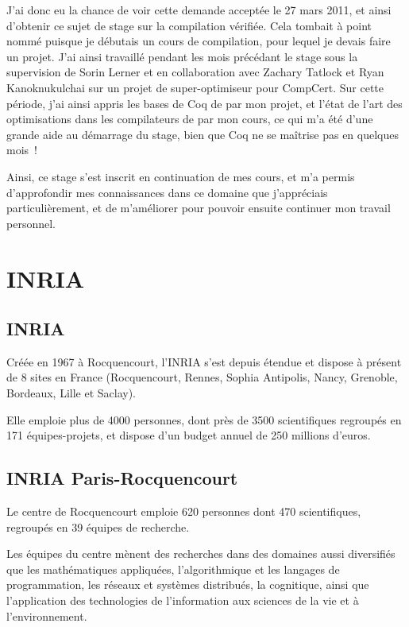 \documentclass{article}
\begin{document}
J'ai donc eu la chance de voir cette demande acceptée le 27 mars 2011, et ainsi
d'obtenir ce sujet de stage sur la compilation vérifiée. Cela tombait à point
nommé puisque je débutais un cours de compilation, pour lequel je devais faire
un projet. J'ai ainsi travaillé pendant les mois précédant le stage sous la
supervision de Sorin Lerner et en collaboration avec Zachary Tatlock et Ryan
Kanoknukulchai sur un projet de super-optimiseur pour CompCert. Sur cette
période, j'ai ainsi appris les bases de Coq de par mon projet, et l'état de
l'art des optimisations dans les compilateurs de par mon cours, ce qui m'a été
d'une grande aide au démarrage du stage, bien que Coq ne se maîtrise pas en
quelques mois~!

Ainsi, ce stage s'est inscrit en continuation de mes cours, et m'a permis
d'approfondir mes connaissances dans ce domaine que j'appréciais
particulièrement, et de m'améliorer pour pouvoir ensuite continuer mon travail
personnel.

\newpage
\section{INRIA}

\subsection{INRIA}

Créée en 1967 à Rocquencourt, l'INRIA s'est depuis étendue et dispose à présent
de 8 sites en France (Rocquencourt, Rennes, Sophia Antipolis, Nancy, Grenoble,
Bordeaux, Lille et Saclay).

Elle emploie plus de 4000 personnes, dont près de 3500 scientifiques regroupés
en 171 équipes-projets, et dispose d'un budget annuel de 250 millions d'euros.

\subsection{INRIA Paris-Rocquencourt}

Le centre de Rocquencourt emploie 620 personnes dont 470 scientifiques,
regroupés en 39 équipes de recherche.

Les équipes du centre mènent des recherches dans des domaines aussi diversifiés
que les mathématiques appliquées, l'algorithmique et les langages de
programmation, les réseaux et systèmes distribués, la cognitique, ainsi que
l'application des technologies de l'information aux sciences de la vie et à
l'environnement.
\end{document}
